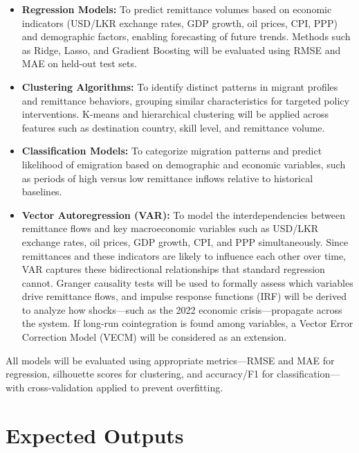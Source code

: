\documentclass[sigconf]{acmart}
\begin{document}
\begin{itemize}
    \item \textbf{Regression Models:} To predict remittance volumes based on economic indicators (USD/LKR exchange rates, GDP growth, oil prices, CPI, PPP) and demographic factors, enabling forecasting of future trends. Methods such as Ridge, Lasso, and Gradient Boosting will be evaluated using RMSE and MAE on held-out test sets.

    \item \textbf{Clustering Algorithms:} To identify distinct patterns in migrant profiles and remittance behaviors, grouping similar characteristics for targeted policy interventions. K-means and hierarchical clustering will be applied across features such as destination country, skill level, and remittance volume.

    \item \textbf{Classification Models:} To categorize migration patterns and predict likelihood of emigration based on demographic and economic variables, such as periods of high versus low remittance inflows relative to historical baselines.

    \item \textbf{Vector Autoregression (VAR):} To model the interdependencies between remittance flows and key macroeconomic variables such as USD/LKR exchange rates, oil prices, GDP growth, CPI, and PPP simultaneously. Since remittances and these indicators are likely to influence each other over time, VAR captures these bidirectional relationships that standard regression cannot. Granger causality tests will be used to formally assess which variables drive remittance flows, and impulse response functions (IRF) will be derived to analyze how shocks---such as the 2022 economic crisis---propagate across the system. If long-run cointegration is found among variables, a Vector Error Correction Model (VECM) will be considered as an extension.
\end{itemize}

All models will be evaluated using appropriate metrics---RMSE and MAE for regression, silhouette scores for clustering, and accuracy/F1 for classification---with cross-validation applied to prevent overfitting.

\section{Expected Outputs}
\end{document}
